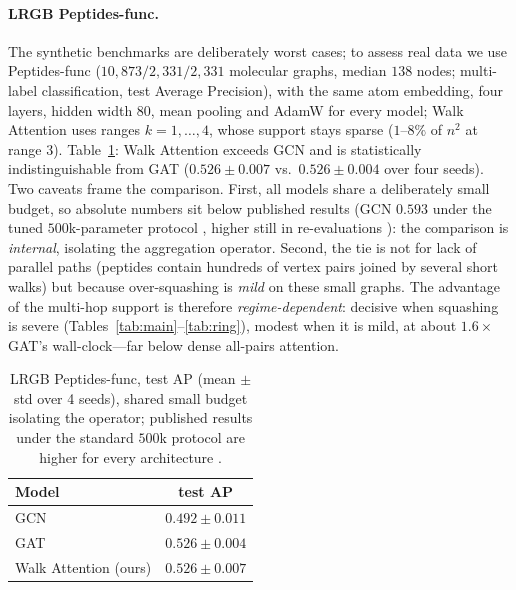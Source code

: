 \documentclass[runningheads]{llncs}
\begin{document}
\paragraph{LRGB Peptides-func.}
The synthetic benchmarks are deliberately worst cases; to assess real data we
use Peptides-func \cite{dwivedi2022lrgb} ($10{,}873/2{,}331/2{,}331$ molecular
graphs, median $138$ nodes; multi-label classification, test Average
Precision), with the same atom embedding, four layers, hidden width $80$, mean
pooling and AdamW for every model; Walk Attention uses ranges $k=1,\dots,4$,
whose support stays sparse ($1$--$8\%$ of $n^2$ at range $3$).
Table~\ref{tab:lrgb}: Walk Attention exceeds GCN and is statistically
indistinguishable from GAT ($0.526\pm0.007$ vs.\ $0.526\pm0.004$ over four
seeds). Two caveats frame the comparison. First, all models share a
deliberately small budget, so absolute numbers sit below published results
(GCN $0.593$ under the tuned $500$k-parameter protocol \cite{dwivedi2022lrgb},
higher still in re-evaluations \cite{tonshoff2023where}): the comparison is
\emph{internal}, isolating the aggregation operator. Second, the tie is not for
lack of parallel paths (peptides contain hundreds of vertex pairs joined by
several short walks) but because over-squashing is \emph{mild} on these small
graphs. The advantage of the multi-hop support is therefore
\emph{regime-dependent}: decisive when squashing is severe
(Tables~\ref{tab:main}--\ref{tab:ring}), modest when it is mild, at about
$1.6\times$ GAT's wall-clock---far below dense all-pairs attention.

\begin{table}[t]
\centering
\caption{LRGB Peptides-func, test AP (mean $\pm$ std over 4 seeds), shared
small budget isolating the operator; published results under the standard
$500$k protocol are higher for every architecture
\cite{dwivedi2022lrgb,tonshoff2023where}.}
\label{tab:lrgb}
\begin{tabular}{lc}
\toprule
\textbf{Model} & \textbf{test AP} \\
\midrule
GCN                          & $0.492\pm0.011$ \\
GAT                          & $0.526\pm0.004$ \\
Walk Attention (ours)        & $0.526\pm0.007$ \\
\bottomrule
\end{tabular}
\end{table}
\end{document}
